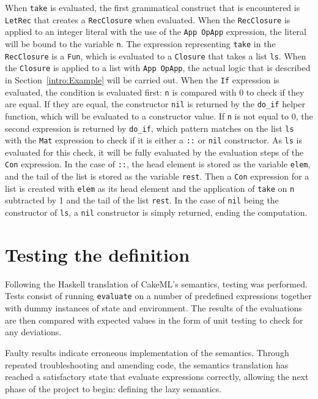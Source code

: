 When \texttt{take} is evaluated, the first grammatical construct that is
encountered is \texttt{LetRec} that creates a \texttt{RecClosure} when evaluated.
When the \texttt{RecClosure} is applied to an integer literal with the use of the
\texttt{App OpApp} expression, the literal will be bound to the variable \texttt{n}.
The expression representing \texttt{take} in the \texttt{RecClosure} is a
\texttt{Fun}, which is evaluated to a \texttt{Closure} that takes a list
\texttt{ls}. When the \texttt{Closure} is applied to a list with \texttt{App OpApp},
the actual logic that is described in
Section~\ref{intro:Example} will be carried out. When the \texttt{If} expression
is evaluated, the condition is evaluated first: \texttt{n} is compared with 0 to
check if they are equal. If they are equal, the constructor \texttt{nil} is
returned by the \texttt{do\_if} helper function, which will
be evaluated to a constructor value.
If \texttt{n} is not equal to 0, the second expression is returned by
\texttt{do\_if}, which pattern matches on the list \texttt{ls} with the
\texttt{Mat} expression to check if it is
either a \texttt{::} or \texttt{nil} constructor. As \texttt{ls} is evaluated
for this check, it will be fully evaluated by the evaluation steps of the
\texttt{Con} expression.
In the case of \texttt{::},
the head element is stored as the variable \texttt{elem}, and the tail of the
list is stored as the variable \texttt{rest}. Then a \texttt{Con} expression
for a list is created with \texttt{elem} as its head element and the application
of \texttt{take} on \texttt{n} subtracted by 1 and the tail of the list
\texttt{rest}. In the case of \texttt{nil} being the constructor of \texttt{ls},
a \texttt{nil} constructor is simply returned, ending the computation.


\section{Testing the definition}
Following the Haskell translation of CakeML's semantics, testing was performed.
Tests consist of running \texttt{evaluate} on a number of predefined
expressions together with dummy instances of state and environment.
The results of the evaluations are then compared with expected values
in the form of unit testing to check for any deviations.

Faulty results indicate erroneous implementation of the semantics.
Through repeated troubleshooting and amending code, the semantics translation
has reached a satisfactory state that evaluate expressions correctly,
allowing the next phase of the project to begin: defining the lazy semantics.
